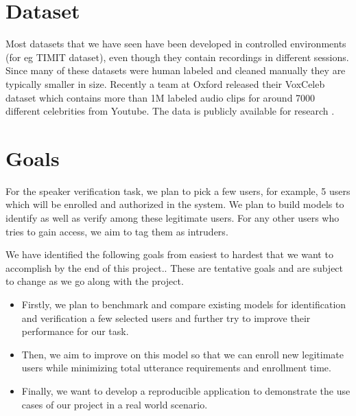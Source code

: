 \documentclass[letterpaper]{article}
\begin{document}

\section{Dataset}
Most datasets that we have seen have been developed in controlled environments (for eg TIMIT dataset), even though they contain recordings in different sessions. Since many of these datasets were human labeled and cleaned manually they are typically smaller in size. Recently a team at Oxford released their VoxCeleb dataset which contains more than 1M labeled audio clips for around 7000 different celebrities from Youtube. The data is publicly available for research \cite{voxCeleb}.



\section{Goals}

For the speaker verification task, we plan to pick a few users, for example, 5 users which will be enrolled and authorized in the system. We plan to build models to identify as well as verify among these legitimate users. For any other users who tries to gain access, we aim to tag them as intruders.


We have identified the following goals from easiest to hardest that we want to accomplish by the end of this project.. These are tentative goals and are subject to change as we go along with the project.

\begin{itemize}
	\item Firstly, we plan to benchmark and compare existing models for identification and verification a few selected users and further try to improve their performance for our task.
	\item Then, we aim to improve on this model so that we can enroll new legitimate users while minimizing total utterance requirements and enrollment time.
	\item Finally, we want to develop a reproducible application to demonstrate the use cases of our project in a real world scenario.
	
\end{itemize}
\end{document}
